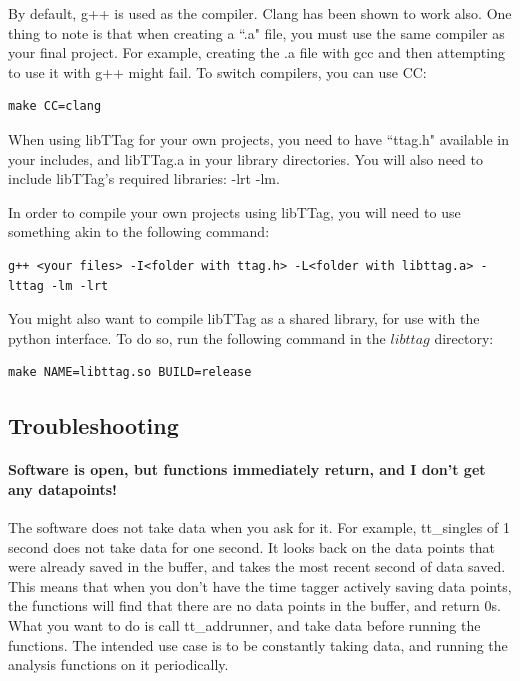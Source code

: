 \documentclass[10pt]{article}
\begin{document}
By default, g++ is used as the compiler. Clang has been shown to work also. One thing to note is that when creating a ``.a" file, you must use the same compiler
as your final project. For example, creating the .a file with gcc and then attempting to use it with g++ might fail. To switch compilers, you can use CC:

\begin{verbatim}
make CC=clang
\end{verbatim}

When using libTTag for your own projects, you need to have ``ttag.h" available in your includes, and libTTag.a in your library directories. You will also need to include
libTTag's required libraries: -lrt -lm. 

In order to compile your own projects using libTTag, you will need to use something akin to the following command:

\begin{verbatim}
g++ <your files> -I<folder with ttag.h> -L<folder with libttag.a> -lttag -lm -lrt
\end{verbatim}

You might also want to compile libTTag as a shared library, for use with the python interface. 
To do so, run the following command in the $libttag$ directory:

\begin{verbatim}
make NAME=libttag.so BUILD=release
\end{verbatim}

\subsection{Troubleshooting}

\paragraph{Software is open, but functions immediately return, and I don't get any datapoints!}

The software does not take data when you ask for it. For example, tt\_singles of 1 second does not take data
for one second. It looks back on the data points that were already saved in the buffer, and takes the most
recent second of data saved. This means that when you don't have the time tagger actively saving data points,
the functions will find that there are no data points in the buffer, and return 0s. What you want to do is
call tt\_addrunner, and take data before running the functions. The intended use case is to be constantly taking data,
and running the analysis functions on it periodically.
\end{document}
